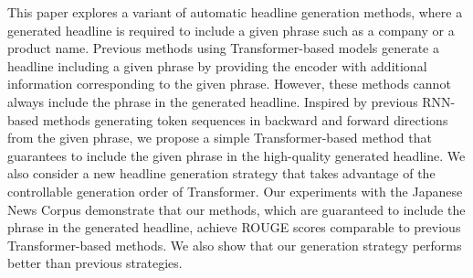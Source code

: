 This paper explores a variant of automatic headline generation methods, where a generated headline is required to include a given phrase such as a company or a product name. Previous methods using Transformer-based models generate a headline including a given phrase by providing the encoder with additional information corresponding to the given phrase. However, these methods cannot always include the phrase in the generated headline. Inspired by previous RNN-based methods generating token sequences in backward and forward directions from the given phrase, we propose a simple Transformer-based method that guarantees to include the given phrase in the high-quality generated headline. We also consider a new headline generation strategy that takes advantage of the controllable generation order of Transformer. Our experiments with the Japanese News Corpus demonstrate that our methods, which are guaranteed to include the phrase in the generated headline, achieve ROUGE scores comparable to previous Transformer-based methods. We also show that our generation strategy performs better than previous strategies.
